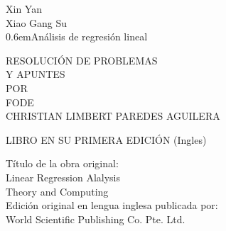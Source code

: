 \begin{titlingpage}

\newcommand\nbvspace[1][3]{\vspace*{\stretch{#1}}}
\newcommand\nbstretchyspace{\spaceskip0.5em plus 0.25em minus 0.25em}
\newcommand{\nbtitlestretch}{\spaceskip0.6em}
\pagestyle{empty}

\begin{center}
\bfseries
\nbvspace[1]

\Large Xin Yan\\
\Large Xiao Gang Su\\
\Huge
{\nbtitlestretch\Huge Análisis de regresión lineal}\\
\nbvspace[1]

RESOLUCIÓN DE PROBLEMAS\\
Y APUNTES\\

\nbvspace[1]
\small POR\\
\Large FODE\\[0.5em]
\footnotesize CHRISTIAN LIMBERT PAREDES AGUILERA\\

\nbvspace[2]

\begin{center}
\end{center}


\nbvspace[3]
\normalsize

LIBRO EN SU PRIMERA EDICIÓN (Ingles)\\
\large
\nbvspace[1]

\end{center}

\break
\bfseries 

\nbvspace[1]
Título de la obra original:\\
Linear Regression Alalysis \\
Theory and Computing\\
Edición original en lengua inglesa publicada por:\\
World Scientific Publishing Co. Pte. Ltd.\\


\end{titlingpage}
